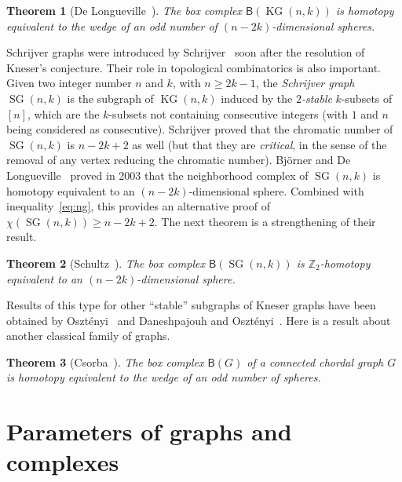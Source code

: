 \documentclass[12pt]{amsart}
\newtheorem{theorem}{Theorem}[section]
\theoremstyle{definition}
\def\Z{\mathbb{Z}}
\def\B{\mathsf{B}}
\renewcommand{\geq}{\geqslant}
\def\KG{\operatorname{KG}}
\def\SG{\operatorname{SG}}
\begin{document}
\begin{theorem}[De Longueville~{\cite[Proposition 2.4]{de2012course}}]
The box complex $\B(\KG(n,k))$ is homotopy equivalent to the wedge of an odd number of $(n-2k)$-dimensional spheres.
\end{theorem}



Schrijver graphs were introduced by Schrijver~\cite{schrijver1978vertex} soon after the resolution of Kneser's conjecture. Their role in topological combinatorics is also important. Given two integer number $n$ and $k$, with $n \geq 2k-1$, the {\em Schrijver graph} $\SG(n,k)$ is the subgraph of $\KG(n,k)$ induced by the {\em $2$-stable} $k$-subsets of $[n]$, which are the $k$-subsets not containing consecutive integers (with $1$ and $n$ being considered as consecutive). Schrijver proved that the chromatic number of $\SG(n,k)$ is $n-2k+2$ as well (but that they are {\em critical}, in the sense of the removal of any vertex reducing the chromatic number). Bj\"orner and De Longueville~\cite{bjorner2003neighborhood} proved in 2003 that the neighborhood complex of $\SG(n,k)$ is homotopy equivalent to an $(n-2k)$-dimensional sphere. Combined with inequality~\eqref{eq:ng}, this provides an alternative proof of $\chi(\SG(n,k))\geq n-2k+2$.
The next theorem is a strengthening of their result. 

\begin{theorem}[Schultz~\cite{schultz2011equivariant}]
The box complex $\B(\SG(n,k))$ is $\Z_2$-homotopy equivalent to an $(n-2k)$-dimensional sphere.
\end{theorem}


Results of this type for other ``stable'' subgraphs of Kneser graphs have been obtained by Oszt\'enyi~\cite{osztenyi2019neighborhood} and Daneshpajouh and Oszt\'enyi~\cite{daneshpajouh2021neighborhood}. Here is a result about another classical family of graphs.

\begin{theorem}[Csorba~\cite{csorba2010homotopy}]
The box complex $\B(G)$ of a connected chordal graph $G$ is homotopy equivalent to the wedge of an odd number of spheres.
\end{theorem}



\section{Parameters of graphs and complexes}\label{sec:parameter}
\end{document}
